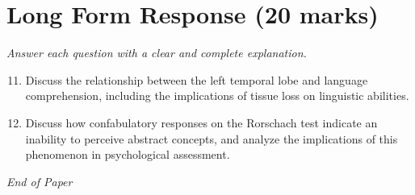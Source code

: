 \documentclass[12pt]{article}
\begin{document}
\section*{Long Form Response (20 marks)}
\textit{Answer each question with a clear and complete explanation.}
\begin{enumerate}[label=\arabic*.]
\setcounter{enumi}{10}
\item Discuss the relationship between the left temporal lobe and language comprehension, including the implications of tissue loss on linguistic abilities.
\item Discuss how confabulatory responses on the Rorschach test indicate an inability to perceive abstract concepts, and analyze the implications of this phenomenon in psychological assessment.
\end{enumerate}

\vfill
\noindent\textit{End of Paper}
\end{document}
